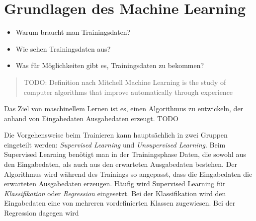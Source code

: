 
\chapter{Grundlagen des Machine Learning}

\begin{itemize}
    \item Warum braucht man Trainingsdaten?
    \item Wie sehen Trainingsdaten aus?
    \item Was für Möglichkeiten gibt es, Trainingsdaten zu bekommen?
\end{itemize}

\begin{quote}
    TODO: Definition nach Mitchell
    Machine Learning is the study of computer algorithms that improve automatically through experience
\end{quote}

Das Ziel von maschinellem Lernen ist es, einen Algorithmus zu entwickeln, der anhand von Eingabedaten Ausgabedaten erzeugt. TODO

Die Vorgehensweise beim Trainieren kann hauptsächlich in zwei Gruppen eingeteilt werden: \textit{Supervised Learning} und \textit{Unsupervised Learning}. Beim Supervised Learning benötigt man in der Trainingsphase Daten, die sowohl aus den Eingabedaten, als auch aus den erwarteten Ausgabedaten bestehen. Der Algorithmus wird während des Trainings so angepasst, dass die Eingabedaten die erwarteten Ausgabedaten erzeugen. Häufig wird Supervised Learning für \textit{Klassifikation} oder \textit{Regression} eingesetzt. Bei der Klassifikation wird den Eingabedaten eine von mehreren vordefinierten Klassen zugewiesen. Bei der Regression dagegen wird 
